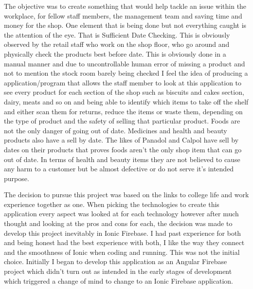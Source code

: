 The objective was to create something that would help tackle an issue within the workplace, for fellow staff members, the management team and saving time and money for the shop. One element that is being done but not everything caught is the attention of the eye. That is Sufficient Date Checking. This is obviously observed by the retail staff who work on the shop floor, who go around and physically check the products best before date. This is obviously done in a manual manner and due to uncontrollable human error of missing a product and not to mention the stock room barely being checked I feel the idea of producing a application/program that allows the staff member to look at this application to see every product for each section of the shop such as biscuits and cakes section, dairy, meats and so on and being able to identify which items to take off the shelf and either scan them for returns, reduce the items or waste them, depending on the type of product and the safety of selling that particular product. Foods are not the only danger of going out of date. Medicines and health and beauty products also have a sell by date. The likes of Panadol and Calpol have sell by dates on their products that proves foods aren't the only shop item that can go out of date. In terms of health and beauty items they are not believed to cause any harm to a customer but be almost defective or do not serve it's intended purpose. 
\newline

The decision to pursue this project was based on the links to college life and work experience together as one. When picking the technologies to create this application every aspect was looked at for each technology however after much thought and looking at the pros and cons for each, the decision was made to develop this project inevitably in Ionic Firebase. I had past experience for both and being honest had the best experience with both, I like the way they connect and the smoothness of Ionic when coding and running. This was not the initial choice. Initially I began to develop this application as an Angular Firebase project which didn't turn out as intended in the early stages of development which triggered a change of mind to change to an Ionic Firebase application.

